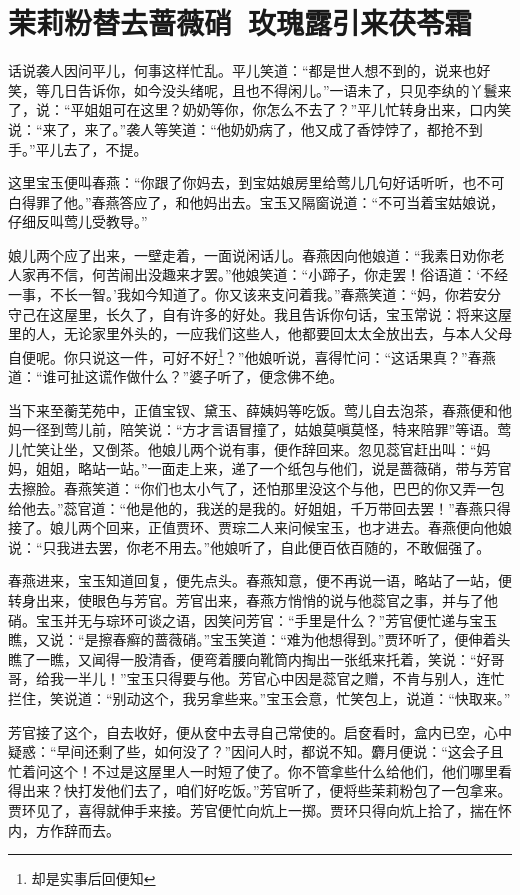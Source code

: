 \documentclass[12pt,oneside]{book}
\begin{document}
\chapter{茉莉粉替去蔷薇硝~玫瑰露引来茯苓霜}
话说袭人因问平儿，何事这样忙乱。平儿笑道：“都是世人想不到的，说来也好笑，等几日告诉你，如今没头绪呢，且也不得闲儿。”一语未了，只见李纨的丫鬟来了，说：“平姐姐可在这里？奶奶等你，你怎么不去了？”平儿忙转身出来，口内笑说：“来了，来了。”袭人等笑道：“他奶奶病了，他又成了香饽饽了，都抢不到手。”平儿去了，不提。

这里宝玉便叫春燕：“你跟了你妈去，到宝姑娘房里给莺儿几句好话听听，也不可白得罪了他。”春燕答应了，和他妈出去。宝玉又隔窗说道：“不可当着宝姑娘说，仔细反叫莺儿受教导。”

娘儿两个应了出来，一壁走着，一面说闲话儿。春燕因向他娘道：“我素日劝你老人家再不信，何苦闹出没趣来才罢。”他娘笑道：“小蹄子，你走罢！俗语道：‘不经一事，不长一智。’我如今知道了。你又该来支问着我。”春燕笑道：“妈，你若安分守己在这屋里，长久了，自有许多的好处。我且告诉你句话，宝玉常说：将来这屋里的人，无论家里外头的，一应我们这些人，他都要回太太全放出去，与本人父母自便呢。你只说这一件，可好不好\footnote{却是实事后回便知}？”他娘听说，喜得忙问：“这话果真？”春燕道：“谁可扯这谎作做什么？”婆子听了，便念佛不绝。

当下来至蘅芜苑中，正值宝钗、黛玉、薛姨妈等吃饭。莺儿自去泡茶，春燕便和他妈一径到莺儿前，陪笑说：“方才言语冒撞了，姑娘莫嗔莫怪，特来陪罪”等语。莺儿忙笑让坐，又倒茶。他娘儿两个说有事，便作辞回来。忽见蕊官赶出叫：“妈妈，姐姐，略站一站。”一面走上来，递了一个纸包与他们，说是蔷薇硝，带与芳官去擦脸。春燕笑道：“你们也太小气了，还怕那里没这个与他，巴巴的你又弄一包给他去。”蕊官道：“他是他的，我送的是我的。好姐姐，千万带回去罢！”春燕只得接了。娘儿两个回来，正值贾环、贾琮二人来问候宝玉，也才进去。春燕便向他娘说：“只我进去罢，你老不用去。”他娘听了，自此便百依百随的，不敢倔强了。

春燕进来，宝玉知道回复，便先点头。春燕知意，便不再说一语，略站了一站，便转身出来，使眼色与芳官。芳官出来，春燕方悄悄的说与他蕊官之事，并与了他硝。宝玉并无与琮环可谈之语，因笑问芳官：“手里是什么？”芳官便忙递与宝玉瞧，又说：“是擦春癣的蔷薇硝。”宝玉笑道：“难为他想得到。”贾环听了，便伸着头瞧了一瞧，又闻得一股清香，便弯着腰向靴筒内掏出一张纸来托着，笑说：“好哥哥，给我一半儿！”宝玉只得要与他。芳官心中因是蕊官之赠，不肯与别人，连忙拦住，笑说道：“别动这个，我另拿些来。”宝玉会意，忙笑包上，说道：“快取来。”

芳官接了这个，自去收好，便从奁中去寻自己常使的。启奁看时，盒内已空，心中疑惑：“早间还剩了些，如何没了？”因问人时，都说不知。麝月便说：“这会子且忙着问这个！不过是这屋里人一时短了使了。你不管拿些什么给他们，他们哪里看得出来？快打发他们去了，咱们好吃饭。”芳官听了，便将些茉莉粉包了一包拿来。贾环见了，喜得就伸手来接。芳官便忙向炕上一掷。贾环只得向炕上拾了，揣在怀内，方作辞而去。
\end{document}
